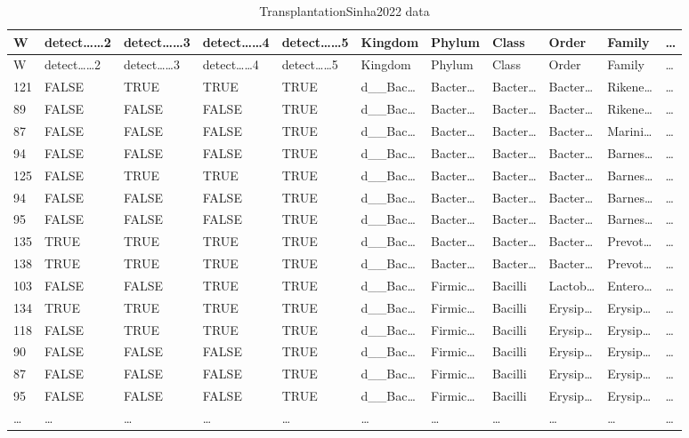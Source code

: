 \documentclass[
]{article}
\begin{document}
\begin{longtable}[]{@{}lllllllllll@{}}
\caption{\label{tab:TransplantationSinha2022-data}TransplantationSinha2022 data}\tabularnewline
\toprule
W & detect\ldots\ldots2 & detect\ldots\ldots3 & detect\ldots\ldots4 & detect\ldots\ldots5 & Kingdom & Phylum & Class & Order & Family & \ldots{}\tabularnewline
\midrule
\endfirsthead
\toprule
W & detect\ldots\ldots2 & detect\ldots\ldots3 & detect\ldots\ldots4 & detect\ldots\ldots5 & Kingdom & Phylum & Class & Order & Family & \ldots{}\tabularnewline
\midrule
\endhead
121 & FALSE & TRUE & TRUE & TRUE & d\_\_Bac\ldots{} & Bacter\ldots{} & Bacter\ldots{} & Bacter\ldots{} & Rikene\ldots{} & \ldots{}\tabularnewline
89 & FALSE & FALSE & FALSE & TRUE & d\_\_Bac\ldots{} & Bacter\ldots{} & Bacter\ldots{} & Bacter\ldots{} & Rikene\ldots{} & \ldots{}\tabularnewline
87 & FALSE & FALSE & FALSE & TRUE & d\_\_Bac\ldots{} & Bacter\ldots{} & Bacter\ldots{} & Bacter\ldots{} & Marini\ldots{} & \ldots{}\tabularnewline
94 & FALSE & FALSE & FALSE & TRUE & d\_\_Bac\ldots{} & Bacter\ldots{} & Bacter\ldots{} & Bacter\ldots{} & Barnes\ldots{} & \ldots{}\tabularnewline
125 & FALSE & TRUE & TRUE & TRUE & d\_\_Bac\ldots{} & Bacter\ldots{} & Bacter\ldots{} & Bacter\ldots{} & Barnes\ldots{} & \ldots{}\tabularnewline
94 & FALSE & FALSE & FALSE & TRUE & d\_\_Bac\ldots{} & Bacter\ldots{} & Bacter\ldots{} & Bacter\ldots{} & Barnes\ldots{} & \ldots{}\tabularnewline
95 & FALSE & FALSE & FALSE & TRUE & d\_\_Bac\ldots{} & Bacter\ldots{} & Bacter\ldots{} & Bacter\ldots{} & Barnes\ldots{} & \ldots{}\tabularnewline
135 & TRUE & TRUE & TRUE & TRUE & d\_\_Bac\ldots{} & Bacter\ldots{} & Bacter\ldots{} & Bacter\ldots{} & Prevot\ldots{} & \ldots{}\tabularnewline
138 & TRUE & TRUE & TRUE & TRUE & d\_\_Bac\ldots{} & Bacter\ldots{} & Bacter\ldots{} & Bacter\ldots{} & Prevot\ldots{} & \ldots{}\tabularnewline
103 & FALSE & FALSE & TRUE & TRUE & d\_\_Bac\ldots{} & Firmic\ldots{} & Bacilli & Lactob\ldots{} & Entero\ldots{} & \ldots{}\tabularnewline
134 & TRUE & TRUE & TRUE & TRUE & d\_\_Bac\ldots{} & Firmic\ldots{} & Bacilli & Erysip\ldots{} & Erysip\ldots{} & \ldots{}\tabularnewline
118 & FALSE & TRUE & TRUE & TRUE & d\_\_Bac\ldots{} & Firmic\ldots{} & Bacilli & Erysip\ldots{} & Erysip\ldots{} & \ldots{}\tabularnewline
90 & FALSE & FALSE & FALSE & TRUE & d\_\_Bac\ldots{} & Firmic\ldots{} & Bacilli & Erysip\ldots{} & Erysip\ldots{} & \ldots{}\tabularnewline
87 & FALSE & FALSE & FALSE & TRUE & d\_\_Bac\ldots{} & Firmic\ldots{} & Bacilli & Erysip\ldots{} & Erysip\ldots{} & \ldots{}\tabularnewline
95 & FALSE & FALSE & FALSE & TRUE & d\_\_Bac\ldots{} & Firmic\ldots{} & Bacilli & Erysip\ldots{} & Erysip\ldots{} & \ldots{}\tabularnewline
\ldots{} & \ldots{} & \ldots{} & \ldots{} & \ldots{} & \ldots{} & \ldots{} & \ldots{} & \ldots{} & \ldots{} & \ldots{}\tabularnewline
\bottomrule
\end{longtable}
\end{document}
